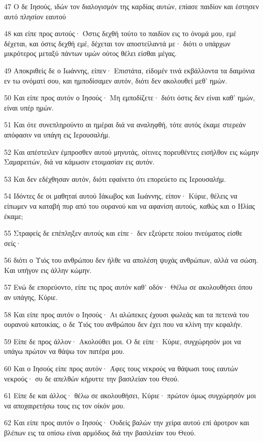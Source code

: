 \par 47 Ο δε Ιησούς, ιδών τον διαλογισμόν της καρδίας αυτών, επίασε παιδίον και έστησεν αυτό πλησίον εαυτού
\par 48 και είπε προς αυτούς· Όστις δεχθή τούτο το παιδίον εις το όνομά μου, εμέ δέχεται, και όστις δεχθή εμέ, δέχεται τον αποστείλαντά με· διότι ο υπάρχων μικρότερος μεταξύ πάντων υμών ούτος θέλει είσθαι μέγας.
\par 49 Αποκριθείς δε ο Ιωάννης, είπεν· Επιστάτα, είδομέν τινά εκβάλλοντα τα δαιμόνια εν τω ονόματί σου, και ημποδίσαμεν αυτόν, διότι δεν ακολουθεί μεθ' ημών.
\par 50 Και είπε προς αυτόν ο Ιησούς· Μη εμποδίζετε· διότι όστις δεν είναι καθ' ημών, είναι υπέρ ημών.
\par 51 Και ότε συνεπληρούντο αι ημέραι διά να αναληφθή, τότε αυτός έκαμε στερεάν απόφασιν να υπάγη εις Ιερουσαλήμ.
\par 52 Και απέστειλεν έμπροσθεν αυτού μηνυτάς, οίτινες πορευθέντες εισήλθον εις κώμην Σαμαρειτών, διά να κάμωσιν ετοιμασίαν εις αυτόν.
\par 53 Και δεν εδέχθησαν αυτόν, διότι εφαίνετο ότι επορεύετο εις Ιερουσαλήμ.
\par 54 Ιδόντες δε οι μαθηταί αυτού Ιάκωβος και Ιωάννης, είπον· Κύριε, θέλεις να είπωμεν να καταβή πυρ από του ουρανού και να αφανίση αυτούς, καθώς και ο Ηλίας έκαμε;
\par 55 Στραφείς δε επέπληξεν αυτούς και είπε· δεν εξεύρετε ποίου πνεύματος είσθε σείς·
\par 56 διότι ο Υιός του ανθρώπου δεν ήλθε να απολέση ψυχάς ανθρώπων, αλλά να σώση. Και υπήγον εις άλλην κώμην.
\par 57 Ενώ δε επορεύοντο, είπε τις προς αυτόν καθ' οδόν· Θέλω σε ακολουθήσει όπου αν υπάγης, Κύριε.
\par 58 Και είπε προς αυτόν ο Ιησούς· Αι αλώπεκες έχουσι φωλεάς και τα πετεινά του ουρανού κατοικίας, ο δε Υιός του ανθρώπου δεν έχει που να κλίνη την κεφαλήν.
\par 59 Είπε δε προς άλλον· Ακολούθει μοι. Ο δε είπε· Κύριε, συγχώρησόν μοι να υπάγω πρώτον να θάψω τον πατέρα μου.
\par 60 Και ο Ιησούς είπε προς αυτόν· Άφες τους νεκρούς να θάψωσι τους εαυτών νεκρούς· συ δε απελθών κήρυττε την βασιλείαν του Θεού.
\par 61 Είπε δε και άλλος· θέλω σε ακολουθήσει, Κύριε· πρώτον όμως συγχώρησόν μοι να αποχαιρετήσω τους εις τον οίκόν μου.
\par 62 Και είπε προς αυτόν ο Ιησούς· Ουδείς βαλών την χείρα αυτού επί άροτρον και βλέπων εις τα οπίσω είναι αρμόδιος διά την βασιλείαν του Θεού.

